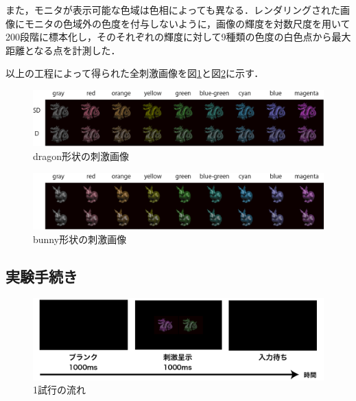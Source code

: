                 また，モニタが表示可能な色域は色相によっても異なる．レンダリングされた画像にモニタの色域外の色度を付与しないように，画像の輝度を対数尺度を用いて200段階に標本化し，そのそれぞれの輝度に対して9種類の色度の白色点から最大距離となる点を計測した．

                
            以上の工程によって得られた全刺激画像を図\ref{ex1_stimuli_d}と図\ref{ex1_stimuli_b}に示す．

            \begin{figure}[h]
                \centering
                \includegraphics[width=14.0cm]{./img/ex1_stimuli_d_p.png}
                \caption{dragon形状の刺激画像}
                \label{ex1_stimuli_d}
            \end{figure}

            \begin{figure}[h]
                \centering
                \includegraphics[width=14.0cm]{./img/ex1_stimuli_b_p.png}
                \caption{bunny形状の刺激画像}
                \label{ex1_stimuli_b}
            \end{figure}

        \subsection{実験手続き}

            \begin{figure}[h]
                \centering
                \includegraphics[width=14.0cm]{./img/ex1_procedure.png}
                \caption{1試行の流れ}
                \label{ex1_procedure}
            \end{figure}

